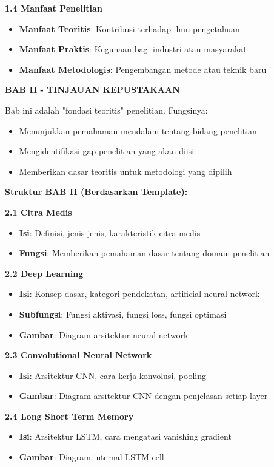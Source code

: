 \textbf{1.4 Manfaat Penelitian}
\begin{itemize}
    \item \textbf{Manfaat Teoritis}: Kontribusi terhadap ilmu pengetahuan
    \item \textbf{Manfaat Praktis}: Kegunaan bagi industri atau masyarakat
    \item \textbf{Manfaat Metodologis}: Pengembangan metode atau teknik baru
\end{itemize}

\textbf{BAB II - TINJAUAN KEPUSTAKAAN}

Bab ini adalah "fondasi teoritis" penelitian. Fungsinya:
\begin{itemize}
    \item Menunjukkan pemahaman mendalam tentang bidang penelitian
    \item Mengidentifikasi gap penelitian yang akan diisi
    \item Memberikan dasar teoritis untuk metodologi yang dipilih
\end{itemize}

\textbf{Struktur BAB II (Berdasarkan Template):}

\textbf{2.1 Citra Medis}
\begin{itemize}
    \item \textbf{Isi}: Definisi, jenis-jenis, karakteristik citra medis
    \item \textbf{Fungsi}: Memberikan pemahaman dasar tentang domain penelitian
\end{itemize}

\textbf{2.2 Deep Learning}
\begin{itemize}
    \item \textbf{Isi}: Konsep dasar, kategori pendekatan, artificial neural network
    \item \textbf{Subfungsi}: Fungsi aktivasi, fungsi loss, fungsi optimasi
    \item \textbf{Gambar}: Diagram arsitektur neural network
\end{itemize}

\textbf{2.3 Convolutional Neural Network}
\begin{itemize}
    \item \textbf{Isi}: Arsitektur CNN, cara kerja konvolusi, pooling
    \item \textbf{Gambar}: Diagram arsitektur CNN dengan penjelasan setiap layer
\end{itemize}

\textbf{2.4 Long Short Term Memory}
\begin{itemize}
    \item \textbf{Isi}: Arsitektur LSTM, cara mengatasi vanishing gradient
    \item \textbf{Gambar}: Diagram internal LSTM cell
\end{itemize}

